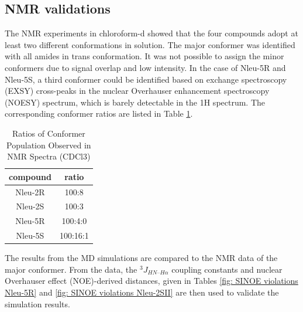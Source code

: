 \FloatBarrier

\subsection{NMR validations}
The NMR experiments in chloroform-d showed that the four compounds adopt at least two different conformations in solution. \cite{Comeau2021}
The major conformer was identified with all amides in trans conformation. 
It was not possible to assign the minor conformers due to signal overlap and low intensity. In the case of Nleu-5R and Nleu-5S, a third conformer could be identified based on exchange spectroscopy (EXSY) cross-peaks in the nuclear Overhauser enhancement spectroscopy (NOESY) spectrum, which is barely detectable in the 1H spectrum. The corresponding conformer ratios are listed in Table \ref{tab: nmrConfRatios}.  

\begin{table}[h!]
    \centering
    \caption{Ratios of Conformer Population Observed in NMR Spectra (CDCl3)}
    \label{tab: nmrConfRatios}
    \begin{adjustbox}{max width=\textwidth}
    \begin{tabular}{cc}
    compound & ratio \\
    \hline
    Nleu-2R &	100:8 \\
    Nleu-2S &   100:3 \\
    Nleu-5R &   100:4:0 \\
    Nleu-5S &	100:16:1 \\
    \hline
    \end{tabular}
    \end{adjustbox}
\end{table}

The results from the MD simulations are compared to the NMR data of the major conformer. From the data, the $^3J_{HN–H\alpha}$ coupling constants and nuclear Overhauser effect (NOE)-derived distances, given in Tables \ref{fig: SINOE violations Nleu-5R} and \ref{fig: SINOE violations Nleu-2SII} are then used to validate the simulation results.

